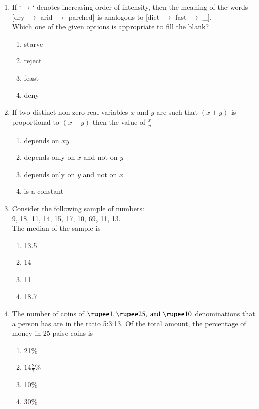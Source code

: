 \documentclass[journal]{IEEEtran}
\theoremstyle{remark}
\begin{document}
\begin{enumerate}
\item If `$\rightarrow$` denotes increasing order of intensity, then the meaning of the words [dry $\rightarrow$ arid $\rightarrow$ parched] is analogous to [diet $\rightarrow$ fast $\rightarrow$ \_]. \hfill{}\\
Which one of the given options is appropriate to fill the blank?
\begin{multicols}{4}
\begin{enumerate}
\item starve
\item reject
\item feast
\item deny
\end{enumerate}
\end{multicols}

\item If two distinct non-zero real variables $x$ and $y$ are such that $(x+y)$ is proportional to $(x-y)$ then the value of $\frac{x}{y}$ \hfill{}
\begin{enumerate}
\item depends on $xy$
\item depends only on $x$ and not on $y$
\item depends only on $y$ and not on $x$
\item is a constant
\end{enumerate}

\item Consider the following sample of numbers:\\
9, 18, 11, 14, 15, 17, 10, 69, 11, 13. \hfill{}\\
The median of the sample is
\begin{multicols}{4}
\begin{enumerate}
\item 13.5
\item 14
\item 11
\item 18.7
\end{enumerate}
\end{multicols}

\item The number of coins of $\text{\rupee} 1, \text{\rupee}25 ,\; \text{and} \;\text{\rupee}10$  denominations that a person has are in the ratio 5:3:13. Of the total amount, the percentage of money in 25 paise coins is \hfill{}
\begin{multicols}{2}
\begin{enumerate}
\item 21\%
\item $14\frac{2}{7}\%$
\item 10\%
\item 30\%
\end{enumerate}
\end{multicols}


\end{enumerate}
\end{document}
